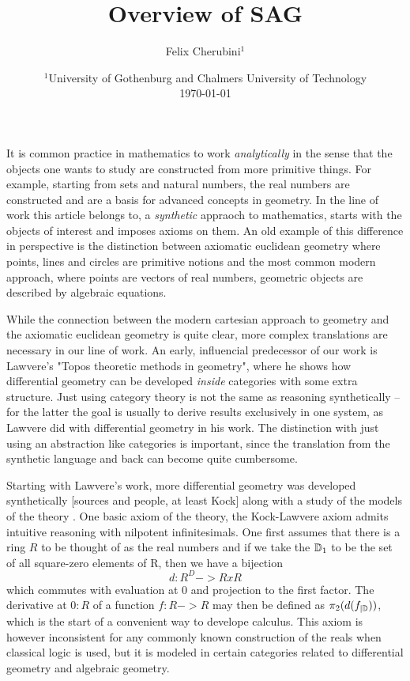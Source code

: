 \documentclass{../util/zariski}
\title{Overview of SAG}
\begin{document}
\author{Felix Cherubini$^1$}
\date{
  $^1$University of Gothenburg and Chalmers University of Technology \\[2ex]%
  \today
}

\maketitle



It is common practice in mathematics to work \emph{analytically} in the sense that the objects one wants to study are constructed from more primitive things.
For example, starting from sets and natural numbers, the real numbers are constructed and are a basis for advanced concepts in geometry.
In the line of work this article belongs to, a \emph{synthetic} appraoch to mathematics,
starts with the objects of interest and imposes axioms on them.
An old example of this difference in perspective is the distinction between axiomatic euclidean geometry where points, lines and circles are primitive notions and the most common modern approach, where points are vectors of real numbers, geometric objects are described by algebraic equations.


While the connection between the modern cartesian approach to geometry and the axiomatic euclidean geometry is quite clear,
more complex translations are necessary in our line of work.
An early, influencial predecessor of our work is Lawvere's "Topos theoretic methods in geometry",
where he shows how differential geometry can be developed \emph{inside} categories with some extra structure.
Just using category theory is not the same as reasoning synthetically -- for the latter the goal is usually to derive results exclusively in one system,
as Lawvere did with differential geometry in his work.
The distinction with just using an abstraction like categories is important, since the translation from the synthetic language and back can become quite cumbersome.

Starting with Lawvere's work, more differential geometry was developed synthetically [sources and people, at least Kock] along with a study of the models of the theory \cite{moerdijk-reyes}.
One basic axiom of the theory, the Kock-Lawvere axiom admits intuitive reasoning with nilpotent infinitesimals.
One first assumes that there is a ring $R$ to be thought of as the real numbers and if we take the $\mathbb{D}_1$ to be the set of all square-zero elements of R, then we have a bijection
\[ d : R^D -> R x R \]
which commutes with evaluation at 0 and projection to the first factor.
The derivative at $0:R$ of a function $f : R -> R$ may then be defined as $\pi_2(d(f_{\vert \mathbb{D}}))$, which is the start of a convenient way to develope calculus.
This axiom is however inconsistent for any commonly known construction of the reals when classical logic is used, but it is modeled in certain categories related to differential geometry and algebraic geometry.
\end{document}
